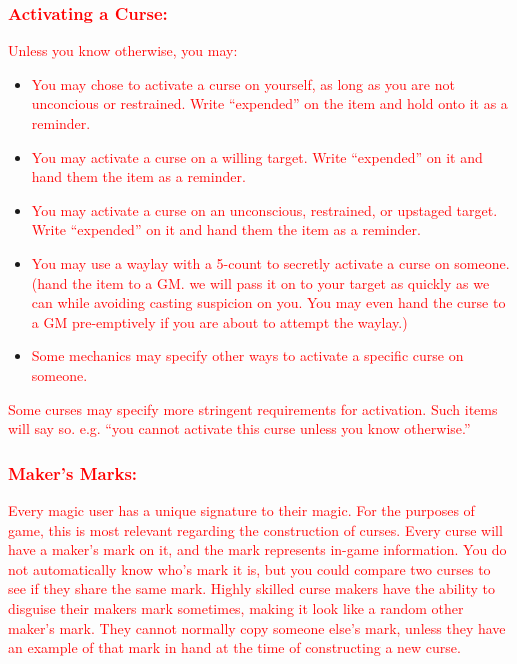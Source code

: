 \documentclass[sheet]{GL2020}
\begin{document}
\textcolor{red}{\subsubsection{Activating a Curse:}}
\textcolor{red}{Unless you know otherwise, you may:}
\begin{itemize}
	\item \textcolor{red}{You may chose to activate a curse on yourself, as long as you are not unconcious or restrained. Write ``expended'' on the item and hold onto it as a reminder.}
	\item \textcolor{red}{You may activate a curse on a willing target. Write ``expended'' on it and hand them the item as a reminder.}
	\item \textcolor{red}{You may activate a curse on an unconscious, restrained, or upstaged target. Write ``expended'' on it and hand them the item as a reminder.}
	\item \textcolor{red}{You may use a waylay with a 5-count to secretly activate a curse on someone. (hand the item to a GM. we will pass it on to your target as quickly as we can while avoiding casting suspicion on you. You may even hand the curse to a GM pre-emptively if you are about to attempt the waylay.)}
	\item \textcolor{red}{Some mechanics may specify other ways to activate a specific curse on someone.}
\end{itemize}

\textcolor{red}{Some curses may specify more stringent requirements for activation. Such items will say so. e.g. ``you cannot activate this curse unless you know otherwise.''}

\textcolor{red}{\subsubsection{Maker's Marks:}}
\textcolor{red}{Every magic user has a unique signature to their magic. For the purposes of game, this is most relevant regarding the construction of curses. Every curse will have a maker's mark on it, and the mark represents in-game information. You do not automatically know who's mark it is, but you could compare two curses to see if they share the same mark. Highly skilled curse makers have the ability to disguise their makers mark sometimes, making it look like a random other maker's mark. They cannot normally copy someone else's mark, unless they have an example of that mark in hand at the time of constructing a new curse.}
\end{document}
